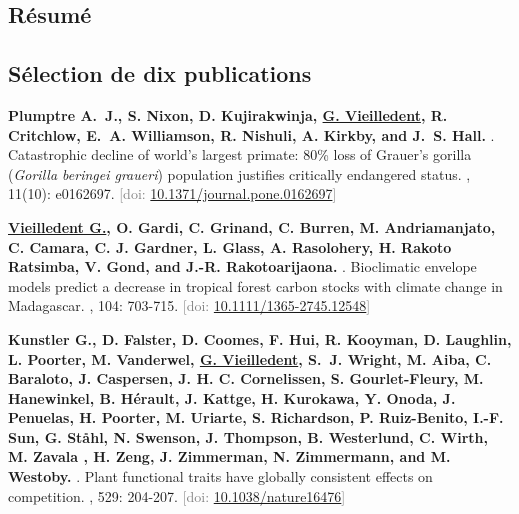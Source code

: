 \documentclass[10pt,a4paper,sans]{moderncv}
\newcounter{enumiv_gv}
\begin{document}
\vspace{0.3cm}
\subsection{Résumé}


\vspace{0.3cm}
\subsection{Sélection de dix publications}

\begin{thebibliography}{10}

\setcounter{enumiv}{9}
\textbf{Plumptre A.~J., S. Nixon, D. Kujirakwinja, \underline{G. Vieilledent}, R. Critchlow, E.~A. Williamson, R. Nishuli, A. Kirkby, and J.~S. Hall.} 
.
\newblock Catastrophic decline of world’s largest primate: 80\% loss of Grauer's gorilla (\emph{Gorilla beringei graueri}) population justifies critically endangered status.
, 11(10): e0162697.
\newblock \textcolor{gray}{[doi: \href{http://dx.doi.org/10.1371/journal.pone.0162697}{10.1371/journal.pone.0162697}]}

\setcounter{enumiv}{8}
\textbf{\underline{Vieilledent G.}, O. Gardi, C. Grinand, C. Burren, M. Andriamanjato, C. Camara, C. J. Gardner, L. Glass, A. Rasolohery, H. Rakoto Ratsimba, V. Gond, and J.-R. Rakotoarijaona.} 
.
\newblock Bioclimatic envelope models predict a decrease in tropical forest carbon stocks with climate change in Madagascar.
, 104: 703-715.
\newblock \textcolor{gray}{[doi: \href{http://dx.doi.org/10.1111/1365-2745.12548}{10.1111/1365-2745.12548}]}

\setcounter{enumiv}{7}
\textbf{Kunstler G., D. Falster, D. Coomes, F. Hui, R. Kooyman, D. Laughlin, L. Poorter, M. Vanderwel, \underline{G. Vieilledent}, S.~J. Wright, M. Aiba, C. Baraloto, J. Caspersen, J. H. C. Cornelissen, S. Gourlet-Fleury, M. Hanewinkel, B. Hérault, J. Kattge, H. Kurokawa, Y. Onoda, J. Penuelas, H. Poorter, M. Uriarte, S. Richardson, P. Ruiz-Benito, I.-F. Sun, G. Ståhl, N. Swenson, J. Thompson, B. Westerlund, C. Wirth, M. Zavala , H. Zeng, J. Zimmerman, N. Zimmermann, and M. Westoby.} 
.
\newblock Plant functional traits have globally consistent effects on competition.
, 529: 204-207.
\newblock \textcolor{gray}{[doi: \href{http://dx.doi.org/10.1038/nature16476}{10.1038/nature16476}]}


\end{thebibliography}
\end{document}
